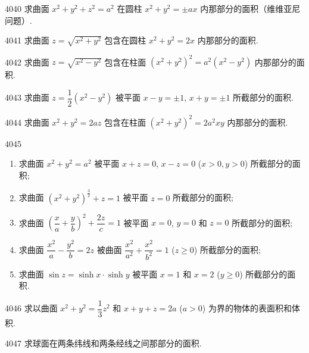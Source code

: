 \begin{prob}[M]{4040}
求曲面 $x^2 + y^2 + z^2 = a^2$ 在圆柱 $x^2 + y^2 = \pm ax$ 内那部分的面积（维维亚尼问题）.
\end{prob}

\begin{prob}[M]{4041}
求曲面 $z = \sqrt{x^2 + y^2}$ 包含在圆柱 $x^2 + y^2 = 2x$ 内那部分的面积.
\end{prob}

\begin{prob}[M]{4042}
求曲面 $z = \sqrt{x^2 - y^2}$ 包含在柱面 $(x^2 + y^2)^2 = a^2(x^2 - y^2)$ 内那部分的面积.
\end{prob}

\begin{prob}[M]{4043}
求曲面 $z = \dfrac{1}{2}(x^2 - y^2)$ 被平面 $x - y = \pm 1$, $x + y = \pm 1$ 所截部分的面积.
\end{prob}

\begin{prob}[M]{4044}
求曲面 $x^2 + y^2 = 2az$ 包含在柱面 $(x^2 + y^2)^2 = 2a^2 xy$ 内那部分的面积.
\end{prob}

\begin{prob}[L]{4045}
\begin{enumerate}[label=(\alph*), itemsep=2pt, topsep=3pt]
  \item 求曲面 $x^2 + y^2 = a^2$ 被平面 $x + z = 0$, $x - z = 0$ ($x > 0, y > 0$) 所截部分的面积;
  \item 求曲面 $(x^2 + y^2)^{\frac{3}{2}} + z = 1$ 被平面 $z = 0$ 所截部分的面积;
  \item 求曲面 $\left(\dfrac{x}{a} + \dfrac{y}{b}\right)^2 + \dfrac{2z}{c} = 1$ 被平面 $x = 0$, $y = 0$ 和 $z = 0$ 所截部分的面积;
  \item 求曲面 $\dfrac{x^2}{a} - \dfrac{y^2}{b} = 2z$ 被曲面 $\dfrac{x^2}{a^2} + \dfrac{x^2}{b^2} = 1$ ($z \geqslant 0$) 所截部分的面积;
  \item 求曲面 $\sin z = \sinh x \cdot \sinh y$ 被平面 $x = 1$ 和 $x = 2$ ($y \geqslant 0$) 所截部分的面积.
\end{enumerate}
\end{prob}

\begin{prob}[M]{4046}
求以曲面 $x^2 + y^2 = \dfrac{1}{3}z^2$ 和 $x + y + z = 2a$ ($a > 0$) 为界的物体的表面积和体积.
\end{prob}

\begin{prob}[M]{4047}
求球面在两条纬线和两条经线之间那部分的面积.
\end{prob}

